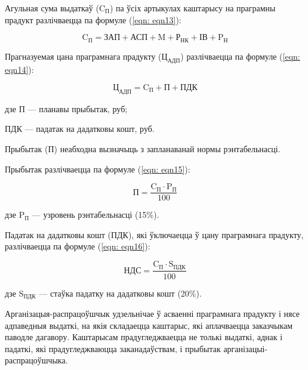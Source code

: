 Агульная сума выдаткаў ($\text{C}_\text{П}$) па ўсіх артыкулах каштарысу на праграмны прадукт разлічваецца па формуле (\ref{eqn: eqn13}):

\begin{equation}
    \label{eqn: eqn13}
    \text{C}_\text{П} = \text{ЗАП} + \text{АСП} + \text{M}
    + \text{Р}_\text{НК} + \text{ІВ} + \text{P}_\text{Н}
\end{equation}

Прагназуемая цана праграмнага прадукту ($\text{Ц}_\text{АДП}$) разлічваецца па формуле (\ref{eqn: eqn14}):

\begin{equation}
    \label{eqn: eqn14}
    \text{Ц}_\text{АДП} = \text{C}_\text{П} + \text{П} + \text{ПДК}
\end{equation}
\begin{Explanation}
    \item[дзе] $\text{П}$ --- планавы прыбытак, руб;
    \item ПДК --- падатак на дадатковы кошт, руб.
\end{Explanation}

Прыбытак (П) неабходна вызначыць з запланаванай нормы рэнтабельнасці.

Прыбытак разлічваецца па формуле (\ref{eqn: eqn15}):

\begin{equation}
    \label{eqn: eqn15}
    \text{П} = \frac{\text{C}_\text{П} \cdot \text{P}_\text{П}}{100}
\end{equation}
\begin{Explanation}
    \item[дзе] $\text{P}_\text{П}$ --- узровень рэнтабельнасці (15\%).
\end{Explanation}

Падатак на дадатковы кошт (ПДК), які ўключаецца ў цану праграмнага прадукту, разлічваецца па формуле (\ref{eqn: eqn16}):

\begin{equation}
    \label{eqn: eqn16}
    \text{НДС} = \frac{\text{C}_\text{П} \cdot \text{S}_\text{ПДК}}{100}
\end{equation}
\begin{Explanation}
    \item[дзе] $\text{S}_\text{ПДК}$ --- стаўка падатку на дадатковы кошт (20\%).
\end{Explanation}

Арганізацыя-распрацоўшчык удзельнічае ў асваенні праграмнага прадукту і нясе адпаведныя выдаткі, на якія складаецца каштарыс, які аплачваецца заказчыкам паводле дагавору. Каштарысам прадугледжваецца не толькі выдаткі, аднак і падаткі, які прадугледжваюцца заканадаўствам, і прыбытак арганізацыі-распрацоўшчыка.

